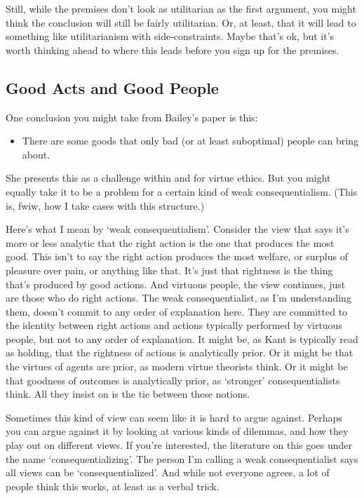 \documentclass[
]{article}
\providecommand{\tightlist}{%
  \setlength{\itemsep}{0pt}\setlength{\parskip}{0pt}}
\begin{document}
Still, while the premises don't look as utilitarian as the first
argument, you might think the conclusion will still be fairly
utilitarian. Or, at least, that it will lead to something like
utilitarianism with side-constraints. Maybe that's ok, but it's worth
thinking ahead to where this leads before you sign up for the premises.

\hypertarget{good-acts-and-good-people}{%
\subsection{Good Acts and Good People}\label{good-acts-and-good-people}}

One conclusion you might take from Bailey's paper is this:

\begin{itemize}
\tightlist
\item
  There are some goods that only bad (or at least suboptimal) people can
  bring about.
\end{itemize}

She presents this as a challenge within and for virtue ethics. But you
might equally take it to be a problem for a certain kind of weak
consequentialism. (This is, fwiw, how I take cases with this structure.)

Here's what I mean by `weak consequentialism'. Consider the view that
says it's more or less analytic that the right action is the one that
produces the most good. This isn't to say the right action produces the
most welfare, or surplus of pleasure over pain, or anything like that.
It's just that rightness is the thing that's produced by good actions.
And virtuous people, the view continues, just are those who do right
actions. The weak consequentialist, as I'm understanding them, doesn't
commit to any order of explanation here. They are committed to the
identity between right actions and actions typically performed by
virtuous people, but not to any order of explanation. It might be, as
Kant is typically read as holding, that the rightness of actions is
analytically prior. Or it might be that the virtues of agents are prior,
as modern virtue theorists think. Or it might be that goodness of
outcomes is analytically prior, as `stronger' consequentialists think.
All they insist on is the tie between these notions.

Sometimes this kind of view can seem like it is hard to argue against.
Perhaps you can argue against it by looking at various kinds of
dilemmas, and how they play out on different views. If you're
interested, the literature on this goes under the name
`consequentializing'. The person I'm calling a weak consequentialist
says all views can be `consequentialized'. And while not everyone
agrees, a lot of people think this works, at least as a verbal trick.
\end{document}
